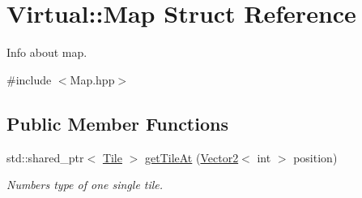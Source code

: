 \hypertarget{struct_virtual_1_1_map}{}\section{Virtual\+:\+:Map Struct Reference}
\label{struct_virtual_1_1_map}


Info about map.  




{\ttfamily \#include $<$Map.\+hpp$>$}

\subsection*{Public Member Functions}
\begin{DoxyCompactItemize}
\item 
std\+::shared\+\_\+ptr$<$ \hyperlink{class_virtual_1_1_tile}{Tile} $>$ \hyperlink{struct_virtual_1_1_map_ae92e86e0da301c4481718bc871086013}{get\+Tile\+At} (\hyperlink{struct_virtual_1_1_vector2}{Vector2}$<$ int $>$ position)
\begin{DoxyCompactList}\small\item\em Numbers type of one single tile. \end{DoxyCompactList}\end{DoxyCompactItemize}
